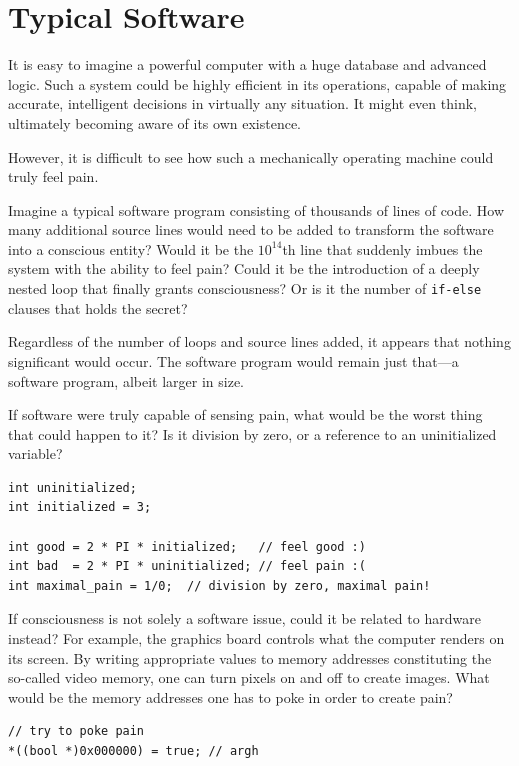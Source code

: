 \chapter{Typical Software}
\label{chap:typical-software}

It is easy to imagine a powerful computer with a huge database and advanced logic. 
Such a system could be highly efficient in its operations, capable of making accurate, intelligent decisions in virtually any situation. It might even think, ultimately becoming aware of its own existence.

However, it is difficult to see how such a mechanically operating machine could truly feel pain.

Imagine a typical software program consisting of thousands of lines of code. How many additional source lines would need to be added to 
transform the software into a conscious entity? Would it be the $10^{14}$th line that suddenly imbues the system with the ability to feel pain? 
Could it be the introduction of a deeply nested loop that finally grants consciousness? Or is it the number of \texttt{if-else} clauses that holds the secret?

Regardless of the number of loops and source lines added, it appears that nothing significant would occur. 
The software program would remain just that---a software program, albeit larger in size.

If software were truly capable of sensing pain, what would be the worst thing that could happen to it? 
Is it division by zero, or a reference to an uninitialized variable?

\begin{verbatim}
int uninitialized;
int initialized = 3;

int good = 2 * PI * initialized;   // feel good :)
int bad  = 2 * PI * uninitialized; // feel pain :(
int maximal_pain = 1/0;  // division by zero, maximal pain!
\end{verbatim}

If consciousness is not solely a software issue, could it be related to hardware instead? For example, the graphics board controls what the 
computer renders on its screen. By writing appropriate values to memory addresses constituting the so-called video memory, one can turn pixels 
on and off to create images. What would be the memory addresses one has to poke in order to create pain?

\begin{verbatim}
// try to poke pain
*((bool *)0x000000) = true; // argh
\end{verbatim}


